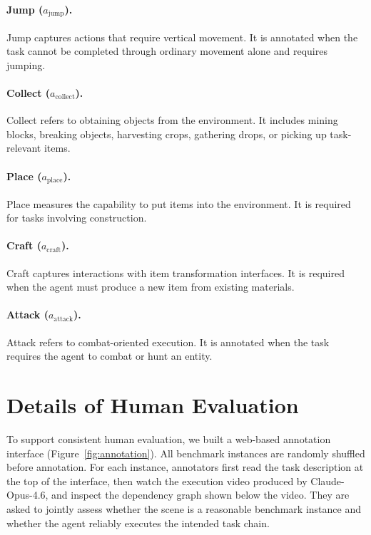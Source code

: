 \documentclass[11pt]{article}
\begin{document}
\paragraph{Jump ($a_{\mathrm{jump}}$).}
Jump captures actions that require vertical movement. It is annotated when the task cannot be completed through ordinary movement alone and requires jumping.

\paragraph{Collect ($a_{\mathrm{collect}}$).}
Collect refers to obtaining objects from the environment. 
It includes mining blocks, breaking objects, harvesting crops, gathering drops, or picking up task-relevant items.

\paragraph{Place ($a_{\mathrm{place}}$).}
Place measures the capability to put items into the environment. 
It is required for tasks involving construction.

\paragraph{Craft ($a_{\mathrm{craft}}$).}
Craft captures interactions with item transformation interfaces. 
It is required when the agent must produce a new item from existing materials.

\paragraph{Attack ($a_{\mathrm{attack}}$).}
Attack refers to combat-oriented execution. 
It is annotated when the task requires the agent to combat or hunt an entity.

\section{Details of Human Evaluation}
\label{appendix: Details of Human Evaluation}

To support consistent human evaluation, we built a web-based annotation interface (Figure~\ref{fig:annotation}). 
All benchmark instances are randomly shuffled before annotation. 
For each instance, annotators first read the task description at the top of the interface, then watch the execution video produced by Claude-Opus-4.6, and inspect the dependency graph shown below the video. 
They are asked to jointly assess whether the scene is a reasonable benchmark instance and whether the agent reliably executes the intended task chain.
\end{document}
